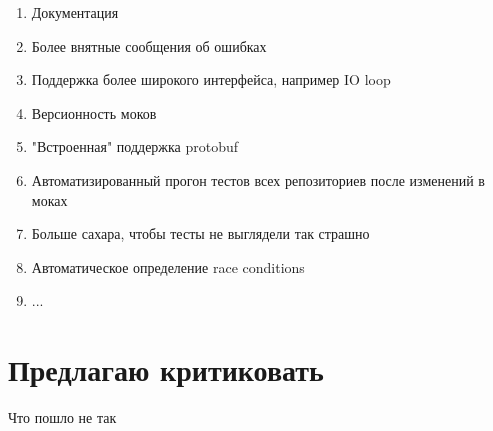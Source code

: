 \documentclass[12pt]{article}
\begin{document}
\begin{enumerate}
\Large \item Документация
\item \normalsize  Более внятные сообщения об ошибках
\item \small Поддержка более широкого интерфейса, например IO loop
\item \small Версионность моков
\item \footnotesize "Встроенная" поддержка protobuf
\item \tiny Автоматизированный прогон тестов всех репозиториев после изменений в моках
\item \scriptsize Больше сахара, чтобы тесты не выглядели так страшно
\item \scriptsize Автоматическое определение race conditions
\item \scriptsize ...




\end{enumerate}

\section{Предлагаю критиковать}
Что пошло не так
\end{document}

